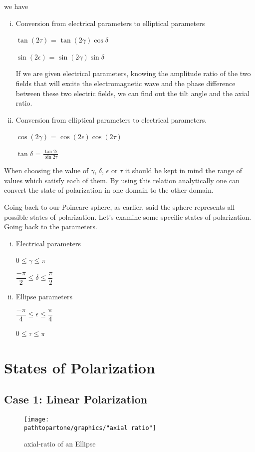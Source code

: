 we have 
\begin{enumerate}[(i)]
\item Conversion from electrical parameters to elliptical parameters

$\tan(2\tau)$ = $\tan(2\gamma)$$\cos$$\delta$

$\sin(2\epsilon)$ = $\sin(2\gamma)$$\sin$$\delta$

If we are given electrical parameters, knowing the amplitude ratio of the two fields that will excite the electromagnetic wave and the phase difference between these two electric fields, we can find out the tilt angle and the axial ratio.
\item Conversion from elliptical parameters to electrical parameters.

$\cos(2\gamma)$ = $\cos(2\epsilon)\cos(2\tau)$

$\tan$$\delta$	= $\frac{\tan2\epsilon}{\sin2\tau}$
\end{enumerate}
When choosing the value of $\gamma$, $\delta$, $\epsilon$ or $\tau$ it should be kept in mind the range of values which satisfy each of them. By using this relation analytically one can convert the state of polarization in one domain to the other domain.

Going back to our Poincare sphere, as earlier, said the sphere represents all possible states of polarization. Let's examine some specific states of polarization. Going back to the parameters.
\begin{enumerate}[(i)]
\item Electrical parameters 

0$\leq$$\gamma$$\leq$$\pi$

$\dfrac{-\pi}{2}$$\leq$$\delta$$\leq$$\dfrac{\pi}{2}$
\item Ellipse parameters

$\dfrac{-\pi}{4}$$\leq$$\epsilon$$\leq$$\dfrac{\pi}{4}$

0$\leq$$\tau$$\leq$$\pi$
\end{enumerate}

\section{States of Polarization}
\subsection{Case 1: Linear Polarization}

\begin{figure}[h]
\centering
\texttt{[image: \\pathtopartone/graphics/"axial ratio"]}
\caption{axial-ratio of an Ellipse}
\label{fig:axial-ratio}
\end{figure}

